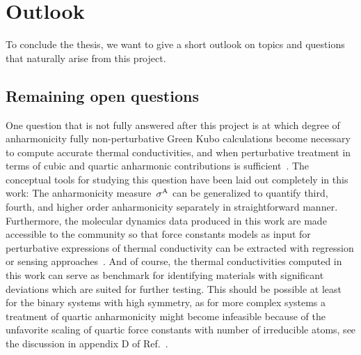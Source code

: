 
\section{Outlook}
To conclude the thesis, we want to give a short outlook on topics and questions that naturally arise from this project.


\subsection{Remaining open questions}
\label{sec:outlook.open_questions}
One question that is not fully answered after this project is at which degree of anharmonicity fully non-perturbative Green Kubo calculations become necessary to compute accurate thermal conductivities, and when perturbative treatment in terms of cubic and quartic anharmonic contributions is sufficient~\cite{Feng2016,Tadano2018,Xia2018,Ravichandran2018}. The conceptual tools for studying this question have been laid out completely in this work: The anharmonicity measure~$\sigma^\mathrm{A}$ can be generalized to quantify third, fourth, and higher order anharmonicity separately in straightforward manner. Furthermore, the molecular dynamics data produced in this work are made accessible to the community so that force constants models as input for perturbative expressions of thermal conductivity can be extracted with regression or sensing approaches~\cite{Zhou2014,Fransson2020}. And of course, the thermal conductivities computed in this work can serve as benchmark for identifying materials with significant deviations which are suited for further testing. This should be possible at least for the binary systems with high symmetry, as for more complex systems a treatment of quartic anharmonicity might become infeasible because of the unfavorite scaling of quartic force constants with number of irreducible atoms, see the discussion in appendix D of Ref.~\cite{Ravichandran2018}.

